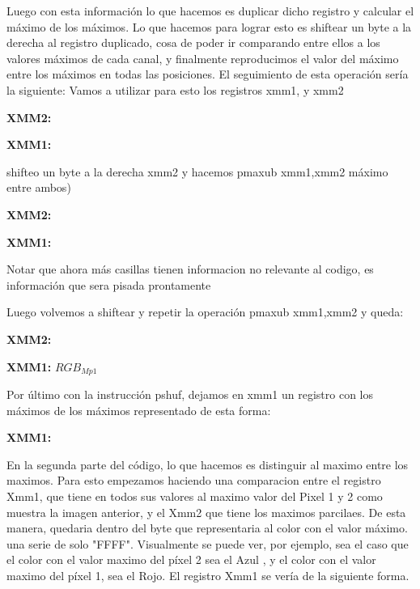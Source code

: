 \par{Luego con esta información lo que hacemos es duplicar dicho registro y calcular el máximo de los máximos. Lo que hacemos para lograr esto es shiftear un byte a la derecha al registro duplicado, cosa de poder ir comparando entre ellos a los valores máximos de cada canal, y finalmente reproducimos el valor del máximo entre los máximos en todas las posiciones. El seguimiento de esta operación sería la siguiente:}
Vamos a utilizar para esto los registros xmm1, y xmm2

\par{\textbf{XMM2:}}
\par{\textbf{XMM1:}}
\par{shifteo un byte a la derecha xmm2 y hacemos pmaxub xmm1,xmm2  máximo entre ambos)}
\par{\textbf{XMM2:}}

\par{\textbf{XMM1:}}
\par {Notar que ahora más casillas tienen informacion no relevante al codigo, es información que sera pisada prontamente}
\par{Luego volvemos a shiftear y repetir la operación pmaxub xmm1,xmm2  y queda: }

\par{\textbf{XMM2:}}

\par{\textbf{XMM1:}}
{{\scriptsize $RGB_{Mp1}$}}
\par{Por último con la instrucción pshuf, dejamos en xmm1 un registro con los máximos de los máximos representado de esta forma: }
\par{\textbf{XMM1:}}

\par{En la segunda parte del código, lo que hacemos es distinguir al maximo entre los maximos. Para esto empezamos haciendo una comparacion entre el registro Xmm1, que tiene en todos sus valores al maximo valor del Pixel 1 y 2 como muestra la imagen anterior, y  el Xmm2 que tiene los maximos parcilaes. De esta manera, quedaria dentro del byte que representaria al color con el valor máximo. una serie de solo "FFFF". Visualmente se puede ver, por ejemplo, sea el caso que el color con el valor maximo del píxel 2 sea el Azul , y el color con el valor maximo del píxel 1, sea el Rojo. El registro Xmm1 se vería de la siguiente forma.}
	 

